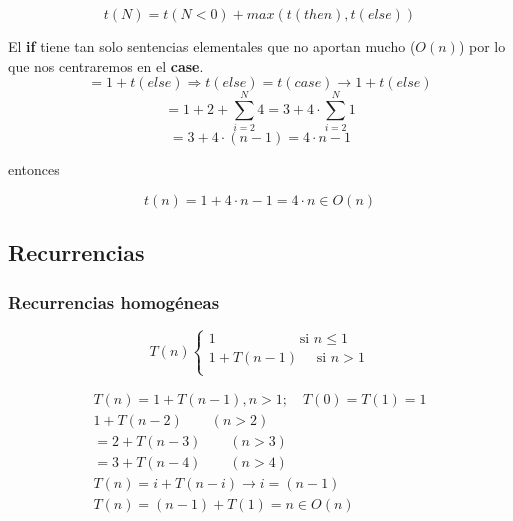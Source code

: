 \documentclass[10pt,a4paper,spanish]{report}
\theoremstyle{definition}
\theoremstyle{remark}
\begin{document}
\begin{displaymath}
    t(N) = t(N<0) + max(t(then), t(else))
\end{displaymath}

El \textbf{\textcolor[rgb]{0.1,0.2,1}{if}} tiene tan solo sentencias elementales que no aportan mucho ($O(n)$) por lo que nos centraremos en el \textbf{\textcolor[rgb]{0.1,0.2,1}{case}}.
\begin{displaymath}
    = 1 + t(else) \Rightarrow t(else) = t(case) \rightarrow 1 + t(else)
\end{displaymath}
\begin{displaymath}
    = 1 + 2 + \sum_{i=2}^{N} 4 = 3 + 4\cdot \sum_{i=2}^{N}1
\end{displaymath}
\begin{displaymath}
    = 3 + 4 \cdot (n - 1) = 4\cdot n - 1
\end{displaymath}
\begin{center}
    entonces    
\end{center}
\begin{displaymath}
    t(n) = 1 + 4\cdot n -1 = 4 \cdot n \in O(n)
\end{displaymath}

\subsection{\textcolor[rgb]{0.1,0.2,1}Recurrencias}

\subsubsection{\textcolor[rgb]{0.1,0.2,1}Recurrencias homogéneas}
\label{recurrencias}

\begin{displaymath}
T(n) \left\{ \begin{array}{ll}
1 \qquad \qquad \qquad \text{si } n \leq 1 \\
1 + T(n-1) \quad \text{  si } n > 1\\
\end{array} \right.
\end{displaymath}

\begin{align}
T(n) = 1 + T(n-1), n > 1; \quad T(0) = T(1) = 1\\
1 + T(n-2) \qquad (n > 2)\\
= 2 + T(n - 3) \qquad (n > 3)\\
= 3 + T(n - 4) \qquad (n > 4)\\
T(n) = i + T(n - i)\rightarrow i = (n - 1)\\
T(n) = (n - 1) + T(1) = n \in O(n)
\end{align}
\end{document}
